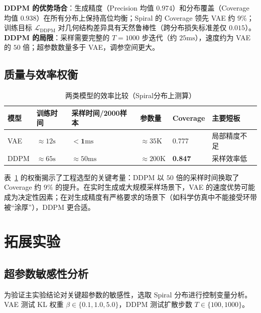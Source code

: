 \documentclass[10pt, a4paper, oneside]{ctexart}
\numberwithin{equation}{section}
\numberwithin{table}{section}
\numberwithin{figure}{section}
\begin{document}
\textbf{DDPM 的优势场合}：生成精度（Precision 均值 $0.974$）和分布覆盖（Coverage 均值 $0.938$）在所有分布上保持高位均衡；Spiral 的 Coverage 领先 VAE 约 $9\%$；训练目标 $\mathcal{L}_{\mathrm{DDPM}}$ 对几何结构差异具有天然鲁棒性（跨分布损失标准差仅 $0.015$）。\textbf{DDPM 的局限}：采样需要完整的 $T=1000$ 步迭代（约 $25\mathrm{ms}$），速度约为 VAE 的 $50$ 倍；超参数数量多于 VAE，调参空间更大。

\subsection{质量与效率权衡}

\begin{table}[!htbp]
\centering
\small
\caption{两类模型的效率比较（Spiral分布上测算）}
\label{tab:efficiency}
\begin{tabular}{p{1.6cm}p{2.0cm}p{3.0cm}p{2.0cm}p{1.8cm}p{2.5cm}}
\toprule
模型 & 训练时间 & 采样时间/2000样本 & 参数量 & Coverage & 主要短板 \\
\midrule
VAE & $\approx 12\mathrm{s}$ & $\mathbf{<1\mathrm{ms}}$ & $\approx 35\mathrm{K}$ & 0.777 & 局部精度不足 \\
DDPM & $\approx 65\mathrm{s}$ & $\approx 50\mathrm{ms}$ & $\approx 200\mathrm{K}$ & \textbf{0.847} & 采样效率低 \\
\bottomrule
\end{tabular}
\end{table}

表~\ref{tab:efficiency} 的权衡揭示了工程选型的关键考量：DDPM 以 $50$ 倍的采样时间换取了 Coverage 约 $9\%$ 的提升。在实时生成或大规模采样场景下，VAE 的速度优势可能成为决定性因素；在对生成精度有严格要求的场景下（如科学仿真中不能接受环带被“涂厚”），DDPM 更合适。

\section{拓展实验}

\subsection{超参数敏感性分析}

为验证主实验结论对关键超参数的敏感性，选取 Spiral 分布进行控制变量分析。VAE 测试 KL 权重 $\beta\in\{0.1, 1.0, 5.0\}$，DDPM 测试扩散步数 $T\in\{100, 1000\}$。
\end{document}
